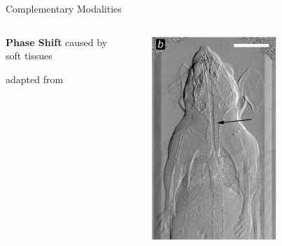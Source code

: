 \documentclass[
 ]{beamer}%
\begin{document}
\begin{frame}{Complementary Modalities}
    \vspace{0.2cm}
    \begin{columns}
        \begin{column}{.62\textwidth}
            \textbf{Phase Shift} caused by soft tissues
            
            \vspace{0.5cm}
            \phaserefraction

            \vspace{1.3cm}
            \scriptsize adapted from \cite{c93883346cc94c57814d1d935575b678}
        \end{column}

        \begin{column}{.28\textwidth}
            \begin{figure}[ht]
                \centering
                \includegraphics[width=0.7\textwidth]{images/XRay_Phase_Contrast.jpg}
                
                \scriptsize\cite{Bech2013}
                \label{fig:phase_contrast}
            \end{figure}
        \end{column}
    \end{columns}
\end{frame}
\end{document}
